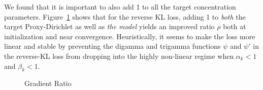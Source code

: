 We found that it is important to also add 1 to all the target concentration parameters. Figure~\ref{fig:grad_ratio_smooth} shows that for the reverse KL loss, adding 1 to \emph{both} the target Proxy-Dirichlet as well as \emph{the model} yields an improved ratio $\rho$ both at initialization and near convergence. Heuristically, it seems to make the loss more linear and stable by preventing the digamma and trigamma functions $\psi$ and $\psi'$ in the reverse-KL loss from dropping into the highly non-linear regime when $\alpha_k < 1$ and $\beta_k < 1$.
\begin{figure}[ht]
    \centering
    \caption{Gradient Ratio}
    \label{fig:grad_ratio_smooth}
\end{figure}

